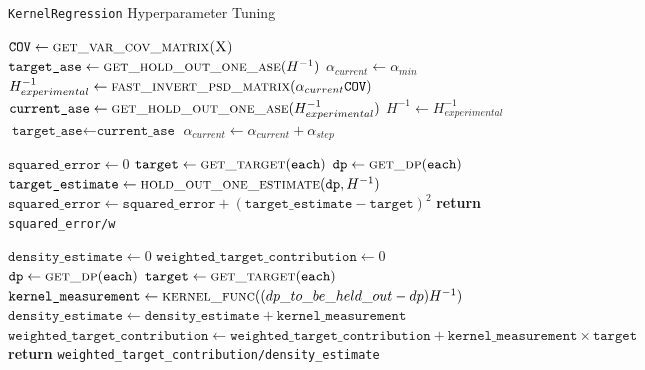 \begin{algorithm}
  \caption{\texttt{KernelRegression} Hyperparameter Tuning}\label{alg:kreg_tune_routine}
  \begin{algorithmic}[1]
		\State $\texttt{COV} \gets \textsc{get\_var\_cov\_matrix(X)}$
		\State $\texttt{target\_ase} \gets \textsc{get\_hold\_out\_one\_ase}(H^{-1})$
		\State $\alpha_{current} \gets \alpha_{min}$
			\State $H_{experimental}^{-1} \gets \textsc{fast\_invert\_psd\_matrix}(\alpha_{current}\texttt{COV})$
			\State $\texttt{current\_ase} \gets \textsc{get\_hold\_out\_one\_ase}(H_{experimental}^{-1})$
				\State $H^{-1} \gets H_{experimental}^{-1}$
				\State $\texttt{target\_ase} \gets \texttt{current\_ase}$
			\EndIf
			\State $\alpha_{current} \gets \alpha_{current} + \alpha_{step}$
		\EndWhile
	\EndProcedure	
  \end{algorithmic}
  \begin{algorithmic}[1]
		\State $\texttt{squared\_error} \gets 0$
			\State $\texttt{target} \gets \textsc{get\_target}(\texttt{each})$
  			\State $\texttt{dp} \gets \textsc{get\_dp}(\texttt{each})$
    		\State $\texttt{target\_estimate} \gets \textsc{hold\_out\_one\_estimate}(\texttt{dp}, H^{-1})$
    		\State $\texttt{squared\_error} \gets \texttt{squared\_error} + (\texttt{target\_estimate}-\texttt{target})^2$
    	\EndWhile
    \State \textbf{return} \texttt{squared\_error/w}
	\EndProcedure	
   \end{algorithmic}
   \begin{algorithmic}[1]
	\State $\texttt{density\_estimate} \gets 0$
	\State $\texttt{weighted\_target\_contribution} \gets 0$
			\State $\texttt{dp} \gets \textsc{get\_dp}(\texttt{each})$
				\State $\texttt{target} \gets \textsc{get\_target}(\texttt{each})$
    			\State $\texttt{kernel\_measurement} \gets \textsc{kernel\_func}((dp\_to\_be\_held\_out-dp)H^{-1})$
    			\State $\texttt{density\_estimate} \gets \texttt{density\_estimate} + \texttt{kernel\_measurement}$
    			\State $\texttt{weighted\_target\_contribution} \gets \texttt{weighted\_target\_contribution} + \texttt{kernel\_measurement}\times\texttt{target}$
    		\EndIf
		\EndWhile
	\State \textbf{return} \texttt{weighted\_target\_contribution/density\_estimate}
	\EndProcedure
	\end{algorithmic}
\end{algorithm}
	










